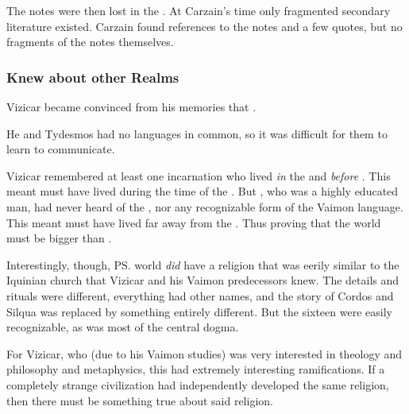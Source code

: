 The notes were then lost in the \Darkfall. 
At Carzain's time only fragmented secondary literature existed. 
Carzain found references to the notes and a few quotes, but no fragments of the notes themselves. 






\subsubsection{Knew about other Realms}
Vizicar became convinced from his memories that .

He and Tydesmos had no languages in common, so it was difficult for them to learn to communicate. 

Vizicar remembered at least one incarnation who lived \emph{in} the \VaimonCaliphate and \emph{before} \Tydesmos{}. 
This meant \Tydesmos{} must have lived during the time of the \VaimonCaliphate. 
But \Tydesmos{}, who was a highly educated man, had never heard of the \caliphate, nor any recognizable form of the Vaimon language. 
This meant \Tydesmos{} must have lived far away from the \caliphate. 
Thus proving that the world must be bigger than \Azmith. 

Interestingly, though, \ps{\Tydesmos} world \emph{did} have a religion that was eerily similar to the Iquinian church that Vizicar and his Vaimon predecessors knew. 
The details and rituals were different, everything had other names, and the story of Cordos and Silqua was replaced by something entirely different.
But the sixteen \sephiroth{} were easily recognizable, as was most of the central dogma. 

For Vizicar, who (due to his Vaimon studies) was very interested in theology and philosophy and metaphysics, this had extremely interesting ramifications. 
If a completely strange civilization had independently developed the same religion, then there must be something true about said religion. 





